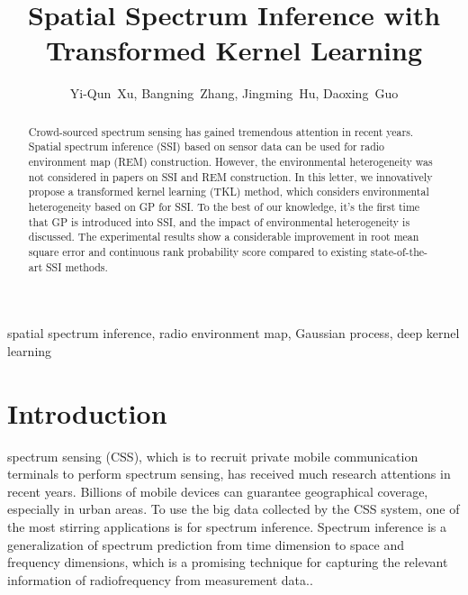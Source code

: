 \documentclass[journal, oneside, twocolumn]{IEEEtran}
\date{}
\title{Spatial Spectrum Inference with Transformed Kernel Learning}
\begin{document}
\author{
  Yi-Qun~Xu,
  Bangning~Zhang, %
  Jingming~Hu, 
  Daoxing~Guo%

}


\maketitle

\begin{abstract}
Crowd-sourced spectrum sensing has gained tremendous attention in recent years. Spatial spectrum inference (SSI) based on sensor data can be used for radio environment map (REM) construction. However, the environmental heterogeneity was not considered in papers on SSI and REM construction. In this letter, we innovatively propose a transformed kernel learning (TKL) method, which considers environmental heterogeneity based on GP for SSI. To the best of our knowledge, it's the first time that GP is introduced into SSI, and the impact of environmental heterogeneity is discussed. The experimental results show a considerable improvement in root mean square error and continuous rank probability score compared to existing state-of-the-art SSI methods.
\end{abstract}

\begin{IEEEkeywords}
  spatial spectrum inference, radio environment map, Gaussian process, deep kernel learning
\end{IEEEkeywords}

\section{Introduction}
 spectrum sensing (CSS), which is to recruit private mobile communication terminals to perform spectrum sensing, has received much research attentions \cite{Ding2014, Jin2018, Han2019, Hu2020, Amin2020} in recent years. Billions of mobile devices can guarantee geographical coverage, especially in urban areas. To use the big data collected by the CSS system, one of the most stirring applications is for spectrum inference. Spectrum inference is a generalization of spectrum prediction from time dimension to space and frequency dimensions, which is a promising technique for capturing the relevant information of radiofrequency from measurement data.\cite{Ding2018}.
\end{document}
